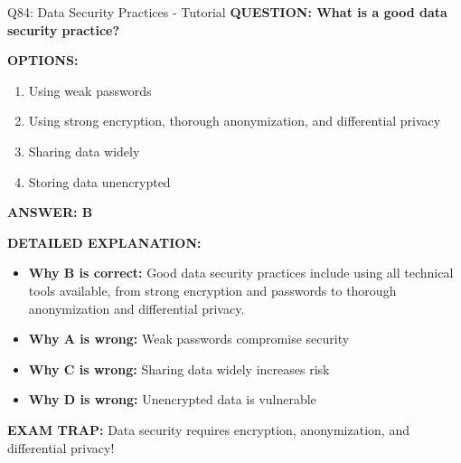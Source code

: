 \documentclass[8pt]{beamer}
\begin{document}
	\begin{frame}{Q84: Data Security Practices - Tutorial}
		\fontsize{6.5}{7.5}\selectfont
		\textbf{QUESTION: What is a good data security practice?}
		
		\vspace{0.1cm}
		\textbf{OPTIONS:}
		\begin{enumerate}
			\item Using weak passwords
			\item Using strong encryption, thorough anonymization, and differential privacy
			\item Sharing data widely
			\item Storing data unencrypted
		\end{enumerate}
		
		\vspace{0.1cm}
		\textcolor{myblue}{\textbf{ANSWER: B}}
		
		\vspace{0.1cm}
		\textbf{DETAILED EXPLANATION:}
		\begin{itemize}
			\item \textbf{Why B is correct:} Good data security practices include using all technical tools available, from strong encryption and passwords to thorough anonymization and differential privacy.
			\item \textbf{Why A is wrong:} Weak passwords compromise security
			\item \textbf{Why C is wrong:} Sharing data widely increases risk
			\item \textbf{Why D is wrong:} Unencrypted data is vulnerable
		\end{itemize}
		
		\textcolor{myred}{\textbf{EXAM TRAP:}} Data security requires \textcolor{myblue}{encryption, anonymization, and differential privacy}!
	\end{frame}
	
\end{document}

